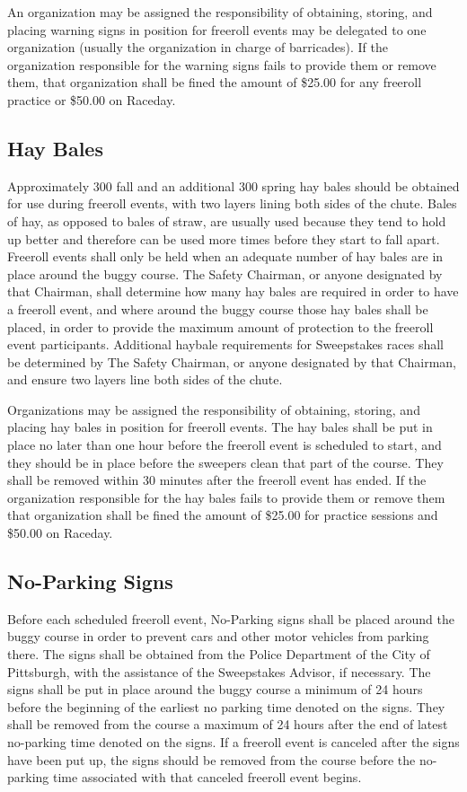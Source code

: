 	An organization may be assigned the responsibility of obtaining, storing, and placing warning signs in position for freeroll events may be delegated to one organization (usually the organization in charge of barricades). If the organization responsible for the warning signs fails to provide them or remove them, that organization shall be fined the amount of \$25.00 for any freeroll practice or \$50.00 on Raceday. 
	
	
\subsection{Hay Bales}
\label{subsec:Haybales}

	Approximately 300 fall and an additional 300 spring hay bales should be obtained for use during freeroll events, with two layers lining both sides of the chute. Bales of hay, as opposed to bales of straw, are usually used because they tend to hold up better and therefore can be used more times before they start to fall apart. Freeroll events shall only be held when an adequate number of hay bales are in place around the buggy course. The Safety Chairman, or anyone designated by that Chairman, shall determine how many hay bales are required in order to have a freeroll event, and where around the buggy course those hay bales shall be placed, in order to provide the maximum amount of protection to the freeroll event participants. Additional haybale requirements for Sweepstakes races shall be determined by The Safety Chairman, or anyone designated by that Chairman, and ensure two layers line both sides of the chute.

	Organizations may be assigned the responsibility of obtaining, storing, and placing hay bales in position for freeroll events. The hay bales shall be put in place no later than one hour before the freeroll event is scheduled to start, and they should be in place before the sweepers clean that part of the course. They shall be removed within 30 minutes after the freeroll event has ended. If the organization responsible for the hay bales fails to provide them or remove them that organization shall be fined the amount of \$25.00 for practice sessions and \$50.00 on Raceday.
	
	
\subsection{No-Parking Signs}
\label{subsec:NoParking}

	Before each scheduled freeroll event, No-Parking signs shall be placed around the buggy course in order to prevent cars and other motor vehicles from parking there. The signs shall be obtained from the Police Department of the City of Pittsburgh, with the assistance of the Sweepstakes Advisor, if necessary. The signs shall be put in place around the buggy course a minimum of 24 hours before the beginning of the earliest no parking time denoted on the signs. They shall be removed from the course a maximum of 24 hours after the end of latest no-parking time denoted on the signs. If a freeroll event is canceled after the signs have been put up, the signs should be removed from the course before the no-parking time associated with that canceled freeroll event begins.

